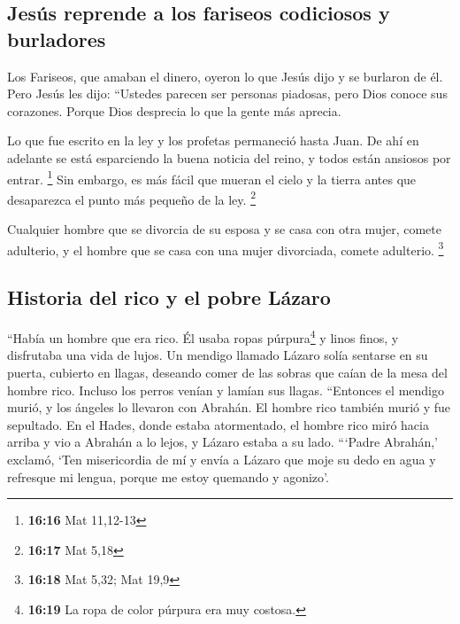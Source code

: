\hypertarget{jesuxfas-reprende-a-los-fariseos-codiciosos-y-burladores}{%
\subsection{Jesús reprende a los fariseos codiciosos y
burladores}\label{jesuxfas-reprende-a-los-fariseos-codiciosos-y-burladores}}

 Los Fariseos, que amaban el dinero, oyeron lo que Jesús
dijo y se burlaron de él.  Pero Jesús les dijo: ``Ustedes
parecen ser personas piadosas, pero Dios conoce sus corazones. Porque
Dios desprecia lo que la gente más aprecia.

 Lo que fue escrito en la ley y los profetas permaneció
hasta Juan. De ahí en adelante se está esparciendo la buena noticia del
reino, y todos están ansiosos por entrar. \footnote{\textbf{16:16} Mat
  11,12-13}  Sin embargo, es más fácil que mueran el
cielo y la tierra antes que desaparezca el punto más pequeño de la ley.
\footnote{\textbf{16:17} Mat 5,18}

 Cualquier hombre que se divorcia de su esposa y se casa
con otra mujer, comete adulterio, y el hombre que se casa con una mujer
divorciada, comete adulterio. \footnote{\textbf{16:18} Mat 5,32; Mat
  19,9}

\hypertarget{historia-del-rico-y-el-pobre-luxe1zaro}{%
\subsection{Historia del rico y el pobre
Lázaro}\label{historia-del-rico-y-el-pobre-luxe1zaro}}

 ``Había un hombre que era rico. Él usaba ropas
púrpura\footnote{\textbf{16:19} La ropa de color púrpura era muy
  costosa.} y linos finos, y disfrutaba una vida de lujos.
 Un mendigo llamado Lázaro solía sentarse en su puerta,
cubierto en llagas,  deseando comer de las sobras que
caían de la mesa del hombre rico. Incluso los perros venían y lamían sus
llagas.  ``Entonces el mendigo murió, y los ángeles lo
llevaron con Abrahán. El hombre rico también murió y fue sepultado.
 En el Hades, donde estaba atormentado, el hombre rico
miró hacia arriba y vio a Abrahán a lo lejos, y Lázaro estaba a su lado.
 ```Padre Abrahán,' exclamó, `Ten misericordia de mí y
envía a Lázaro que moje su dedo en agua y refresque mi lengua, porque me
estoy quemando y agonizo'.

